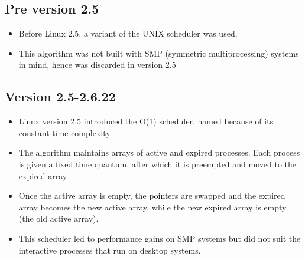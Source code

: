 \documentclass{article}
\theoremstyle{plain}
\theoremstyle{definition}
\begin{document}
\subsection{Pre version 2.5}
\begin{itemize}
    \item Before Linux 2.5, a variant of the UNIX scheduler was used.
    
    \item This algorithm was not built with SMP (symmetric multiprocessing) systems in mind, hence was discarded in version 2.5
\end{itemize}

\subsection{Version 2.5-2.6.22}
\begin{itemize}
    \item Linux version 2.5 introduced the O(1) scheduler, named because of its constant time complexity. 
    
    \item The algorithm maintains arrays of active and expired processes. Each process is given a fixed time quantum, after which it is preempted and moved to the expired array
    
    \item Once the active array is empty, the pointers are swapped and the expired array becomes the new active array, while the new expired array is empty (the old active array). 
    
    \item This scheduler led to performance gains on SMP systems but did not suit the interactive processes that run on desktop systems. 
\end{itemize}
\end{document}
